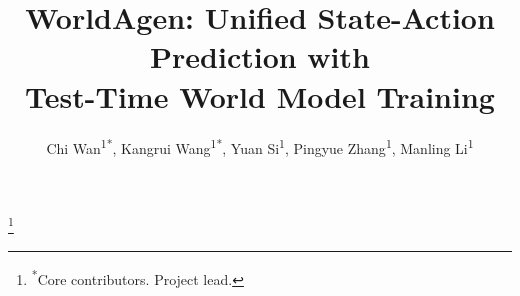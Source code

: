 \documentclass[letterpaper]{article} %
\title{WorldAgen: Unified State-Action Prediction with \\ Test-Time World Model Training}
\author{
    Chi Wan\textsuperscript{\rm 1}\textsuperscript{*},
    Kangrui Wang\textsuperscript{\rm 1}\textsuperscript{*\dag},
    Yuan Si\textsuperscript{\rm 1},
    Pingyue Zhang\textsuperscript{\rm 1},
    Manling Li\textsuperscript{\rm 1}
}
\newcommand\blfootnote[1]{%
  \begingroup
  \renewcommand\thefootnote{}\footnote{#1}%
  \addtocounter{footnote}{-1}%
  \endgroup
}
\begin{document}
\maketitle

\blfootnote{\textsuperscript{*}Core contributors. \quad \textsuperscript{\dag}Project lead.}












\end{document}
